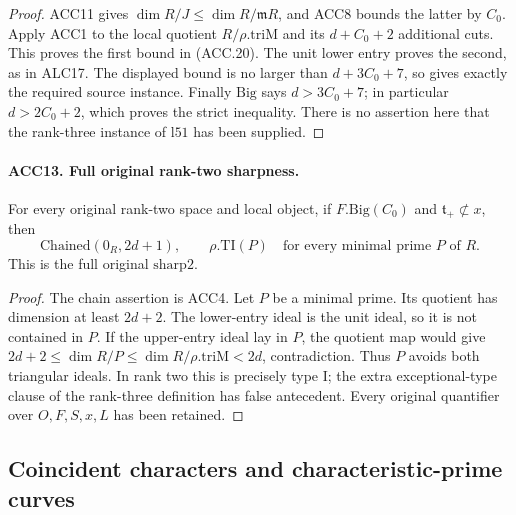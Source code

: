\documentclass[11pt,a4paper]{article}
\numberwithin{equation}{section}
\theoremstyle{remark}\newtheorem{remark}[theorem]{Remark}
\begin{document}
\begin{proof}
ACC11 gives \(\dim R/J\le\dim R/\mathfrak mR\), and ACC8
bounds the latter by \(C_0\).  Apply ACC1 to the local quotient
\(R/\rho.\mathrm{triM}\) and its \(d+C_0+2\) additional
cuts.  This proves the first bound in (ACC.20).  The unit lower
entry proves the second, as in ALC17.  The displayed bound is no
larger than \(d+3C_0+7\), so gives exactly the required source
instance.  Finally \(\mathrm{Big}\) says \(d>3C_0+7\);
in particular \(d>2C_0+2\), which proves the strict inequality.
There is no assertion here that the rank-three instance of
\(\mathrm{l51}\) has been supplied.
\end{proof}

\paragraph{ACC13. Full original rank-two sharpness.}
\label{claim:ACC13}
For every original rank-two space and local object, if
\(F.\mathrm{Big}(C_0)\) and \(\mathfrak t_+\not\subset x\),
then
\[
 \mathrm{Chained}(0_R,2d+1),\qquad
       \rho.\mathrm{TI}(P)\quad\text{for every minimal prime }P
       \text{ of }R.                                     \tag{ACC.21}
\]
This is the full original \(\mathrm{sharp2}\).

\begin{proof}
The chain assertion is ACC4.  Let \(P\) be a minimal prime.
Its quotient has dimension at least \(2d+2\).  The lower-entry
ideal is the unit ideal, so it is not contained in \(P\).
If the upper-entry ideal lay in \(P\), the quotient map would
give
\(2d+2\le\dim R/P\le\dim R/\rho.\mathrm{triM}<2d\),
contradiction.  Thus \(P\) avoids both triangular ideals.
In rank two this is precisely type I; the extra exceptional-type
clause of the rank-three definition has false antecedent.  Every
original quantifier over \(O,F,S,x,L\) has been retained.
\end{proof}

\subsection{Coincident characters and characteristic-prime curves}

\end{document}
